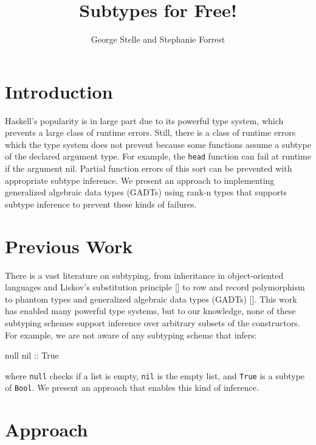 \documentclass[]{article}
\title{Subtypes for Free!}
\author{George Stelle and Stephanie Forrest}
\date{}
\newenvironment{Shaded}{}{}
\newcommand{\DataTypeTok}[1]{\textcolor[rgb]{0.56,0.13,0.00}{{#1}}}
\newcommand{\OtherTok}[1]{\textcolor[rgb]{0.00,0.44,0.13}{{#1}}}
\newcommand{\NormalTok}[1]{{#1}}
\begin{document}
\maketitle

\section{Introduction}\label{introduction}

Haskell's popularity is in large part due to its powerful type system,
which prevents a large class of runtime errors. Still, there is a class
of runtime errors which the type system does not prevent because some
functions assume a subtype of the declared argument type. For example,
the \texttt{head} function can fail at runtime if the argument nil.
Partial function errors of this sort can be prevented with appropriate
subtype inference. We present an approach to implementing generalized
algebraic data types (GADTs) using rank-n types that supports subtype
inference to prevent these kinds of failures.

\section{Previous Work}\label{previous-work}

There is a vast literature on subtyping, from inheritance in
object-oriented languages and Liskov's substitution principle
{[}\cite{liskov1994behavioral}{]} to row and record polymorphism to
phantom types and generalized algebraic data types (GADTs)
{[}\cite{odersky2004overview, leroy2014ocaml}{]}. This work has enabled
many powerful type systems, but to our knowledge, none of these
subtyping schemes support inference over arbitrary subsets of the
constructors. For example, we are not aware of any subtyping scheme that
infers:

\begin{Shaded}
\begin{Highlighting}[]
   \NormalTok{null}\OtherTok{ nil ::} \DataTypeTok{True}
\end{Highlighting}
\end{Shaded}

where \texttt{null} checks if a list is empty, \texttt{nil} is the empty
list, and \texttt{True} is a subtype of \texttt{Bool}. We present an
approach that enables this kind of inference.

\section{Approach}\label{approach}
\end{document}
